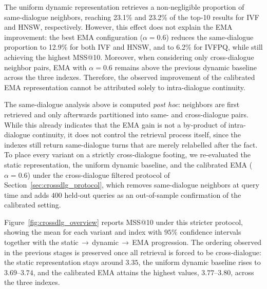 \documentclass[runningheads]{llncs}
\begin{document}
The uniform dynamic representation retrieves a non-negligible proportion of same-dialogue neighbors, reaching 23.1\% and 23.2\% of the top-10 results for IVF and HNSW, respectively. However, this effect does not explain the EMA improvement: the best EMA configuration ($\alpha=0.6$) reduces the same-dialogue proportion to 12.9\% for both IVF and HNSW, and to 6.2\% for IVFPQ, while still achieving the highest MSS@10. Moreover, when considering only cross-dialogue neighbor pairs, EMA with $\alpha=0.6$ remains above the previous dynamic baseline across the three indexes. Therefore, the observed improvement of the calibrated EMA representation cannot be attributed solely to intra-dialogue continuity.

The same-dialogue analysis above is computed \emph{post hoc}: neighbors are first retrieved and only afterwards partitioned into same- and cross-dialogue pairs. While this already indicates that the EMA gain is not a by-product of intra-dialogue continuity, it does not control the retrieval process itself, since the indexes still return same-dialogue turns that are merely relabelled after the fact. To place every variant on a strictly cross-dialogue footing, we re-evaluated the static representation, the uniform dynamic baseline, and the calibrated EMA ($\alpha=0.6$) under the cross-dialogue filtered protocol of Section~\ref{sec:crossdlg_protocol}, which removes same-dialogue neighbors at query time and adds $400$ held-out queries as an out-of-sample confirmation of the calibrated setting.

Figure~\ref{fig:crossdlg_overview} reports MSS@10 under this stricter protocol, showing the mean for each variant and index with $95\%$ confidence intervals together with the static$\,\rightarrow\,$dynamic$\,\rightarrow\,$EMA progression. The ordering observed in the previous stages is preserved once all retrieval is forced to be cross-dialogue: the static representation stays around $3.35$, the uniform dynamic baseline rises to $3.69$--$3.74$, and the calibrated EMA attains the highest values, $3.77$--$3.80$, across the three indexes.

\end{document}
